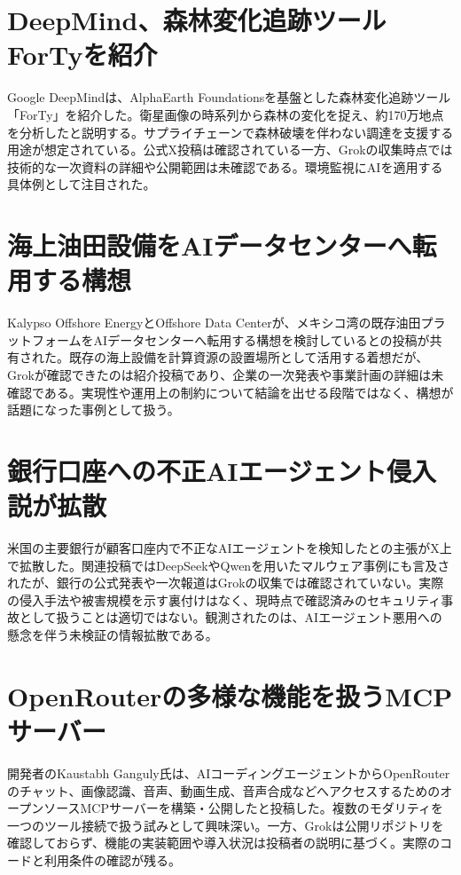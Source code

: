 \section{DeepMind、森林変化追跡ツールForTyを紹介}
Google DeepMindは、AlphaEarth Foundationsを基盤とした森林変化追跡ツール「ForTy」を紹介した。衛星画像の時系列から森林の変化を捉え、約170万地点を分析したと説明する。サプライチェーンで森林破壊を伴わない調達を支援する用途が想定されている。公式X投稿は確認されている一方、Grokの収集時点では技術的な一次資料の詳細や公開範囲は未確認である。環境監視にAIを適用する具体例として注目された。

\section{海上油田設備をAIデータセンターへ転用する構想}
Kalypso Offshore EnergyとOffshore Data Centerが、メキシコ湾の既存油田プラットフォームをAIデータセンターへ転用する構想を検討しているとの投稿が共有された。既存の海上設備を計算資源の設置場所として活用する着想だが、Grokが確認できたのは紹介投稿であり、企業の一次発表や事業計画の詳細は未確認である。実現性や運用上の制約について結論を出せる段階ではなく、構想が話題になった事例として扱う。

\section{銀行口座への不正AIエージェント侵入説が拡散}
米国の主要銀行が顧客口座内で不正なAIエージェントを検知したとの主張がX上で拡散した。関連投稿ではDeepSeekやQwenを用いたマルウェア事例にも言及されたが、銀行の公式発表や一次報道はGrokの収集では確認されていない。実際の侵入手法や被害規模を示す裏付けはなく、現時点で確認済みのセキュリティ事故として扱うことは適切ではない。観測されたのは、AIエージェント悪用への懸念を伴う未検証の情報拡散である。

\section{OpenRouterの多様な機能を扱うMCPサーバー}
開発者のKaustabh Ganguly氏は、AIコーディングエージェントからOpenRouterのチャット、画像認識、音声、動画生成、音声合成などへアクセスするためのオープンソースMCPサーバーを構築・公開したと投稿した。複数のモダリティを一つのツール接続で扱う試みとして興味深い。一方、Grokは公開リポジトリを確認しておらず、機能の実装範囲や導入状況は投稿者の説明に基づく。実際のコードと利用条件の確認が残る。

